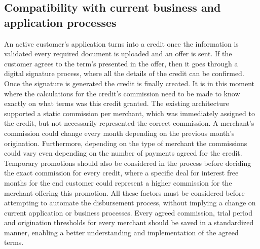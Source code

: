 \subsection{Compatibility with current business and application processes}
An active customer’s application turns into a credit once the information is validated every required document is uploaded and an offer is sent. If the customer agrees to the term’s presented in the offer, then it goes through a digital signature process, where all the details of the credit can be confirmed. Once the signature is generated the credit is finally created. It is in this moment where the calculations for the credit’s commission need to be made to know exactly on what terms was this credit granted. The existing architecture supported a static commission per merchant, which was immediately assigned to the credit, but not necessarily represented the correct commission.
A merchant’s commission could change every month depending on the previous month’s origination. Furthermore, depending on the type of merchant the commissions could vary even depending on the number of payments agreed for the credit. Temporary promotions should also be considered in the process before deciding the exact commission for every credit, where a specific deal for interest free months for the end customer could represent a higher commission for the merchant offering this promotion.
All these factors must be considered before attempting to automate the disbursement process, without implying a change on current application or business processes. 
Every agreed commission, trial period and origination thresholds for every merchant should be saved in a standardized manner, enabling a better understanding and implementation of the agreed terms.

